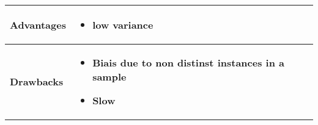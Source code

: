  \begin{table}[!h]
    \begin{center}
    \begin{tabular}{| m{8em}| m{15em}|}
    \hline
    \rowcolor{vert.g} \textbf{Advantages}     &  \begin{itemize}
                                                        \item \textbf{low variance}
                                                 \end{itemize}\\ \hline 
    \rowcolor{red.g} \textbf{Drawbacks}       &  \begin{itemize}
                                                        \item \textbf{Biais due to non distinst instances in a sample}
                                                        \item \textbf{Slow} 
                                                  \end{itemize}\\ \hline
    \end{tabular}
    \end{center}
    \end{table}
    
